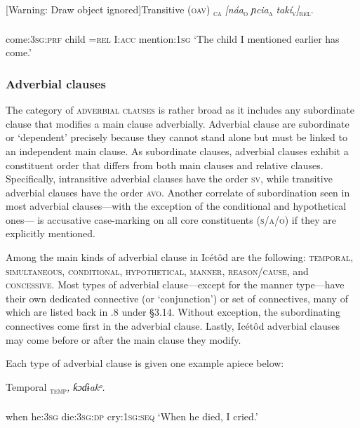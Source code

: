 [Warning: Draw object ignored]Transitive (\textsc{oav})
\ea\label{ex:}
\textsc{\textsubscript{ca}}\textit{   [náa}\textsc{\textsubscript{o}}\textit{   ɲcia}\textsc{\textsubscript{a}}\textit{   takí}\textsc{\textsubscript{v}}\textit{]}\textsc{\textsubscript{rel}}. \\
    \\
come:\textsc{3sg}:\textsc{prf}   child   =\textsc{rel}   I:\textsc{acc}   mention:\textsc{1sg}
\glt ‘The child I mentioned earlier has come.’ 
\z




\subsubsection{Adverbial clauses}

The category of \textsc{adverbial clauses} is rather broad as it includes any subordinate clause that modifies a main clause adverbially. Adverbial clause are subordinate or ‘dependent’ precisely because they cannot stand alone but must be linked to an independent main clause. As subordinate clauses, adverbial clauses exhibit a constituent order that differs from both main clauses and relative clauses. Specifically, intransitive adverbial clauses have the order \textsc{sv}, while transitive adverbial clauses have the order \textsc{avo}. Another correlate of subordination seen in most adverbial clauses—with the exception of the conditional and hypothetical ones— is accusative case-marking on all core constituents (\textsc{s/a/o}) if they are explicitly mentioned. 

Among the main kinds of adverbial clause in Icétôd are the following: \textsc{temporal}, \textsc{simultaneous}, \textsc{conditional}, \textsc{hypothetical}, \textsc{manner}, \textsc{reason}/\textsc{cause}, and \textsc{concessive}. Most types of adverbial clause—except for the manner type—have their own dedicated connective (or ‘conjunction’) or set of connectives, many of which are listed back in .8 under §3.14. Without exception, the subordinating connectives come first in the adverbial clause. Lastly, Icétôd adverbial clauses may come before or after the main clause they modify. 

Each type of adverbial clause is given one example apiece below:




Temporal
\ea\label{ex:}
\textsc{\textsubscript{temp}}\textit{,   ƙɔɗɨakᵒ.} \\
    \\
when   he:\textsc{3sg}   die:\textsc{3sg:dp}     cry:\textsc{1sg:seq}
\glt ‘When he died, I cried.’ 
\z




